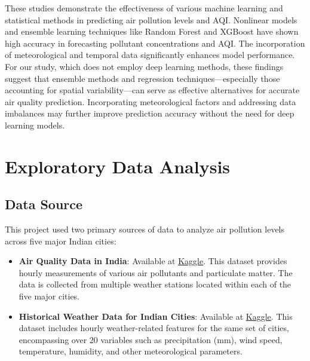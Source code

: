 \documentclass[twoside,11pt]{article}
\begin{document}
These studies demonstrate the effectiveness of various machine learning and statistical methods in predicting air pollution levels and AQI. Nonlinear models and ensemble learning techniques like Random Forest and XGBoost have shown high accuracy in forecasting pollutant concentrations and AQI. The incorporation of meteorological and temporal data significantly enhances model performance. For our study, which does not employ deep learning methods, these findings suggest that ensemble methods and regression techniques—especially those accounting for spatial variability—can serve as effective alternatives for accurate air quality prediction. Incorporating meteorological factors and addressing data imbalances may further improve prediction accuracy without the need for deep learning models.

\newpage






\section{Exploratory Data Analysis}

\subsection{Data Source}

This project used two primary sources of data to analyze air pollution levels across five major Indian cities:

\begin{itemize}
    \item \textbf{Air Quality Data in India}: Available at \href{https://www.kaggle.com/datasets/rohanrao/air-quality-data-in-india}{\uline{Kaggle}}. This dataset provides hourly measurements of various air pollutants and particulate matter. The data is collected from multiple weather stations located within each of the five major cities.

    \item \textbf{Historical Weather Data for Indian Cities}: Available at \href{https://www.kaggle.com/datasets/hiteshsoneji/historical-weather-data-for-indian-cities}{\uline{Kaggle}}. This dataset includes hourly weather-related features for the same set of cities, encompassing over 20 variables such as precipitation (mm), wind speed, temperature, humidity, and other meteorological parameters. \citep{hitesh_soneji_2020}
\end{itemize}
\end{document}
